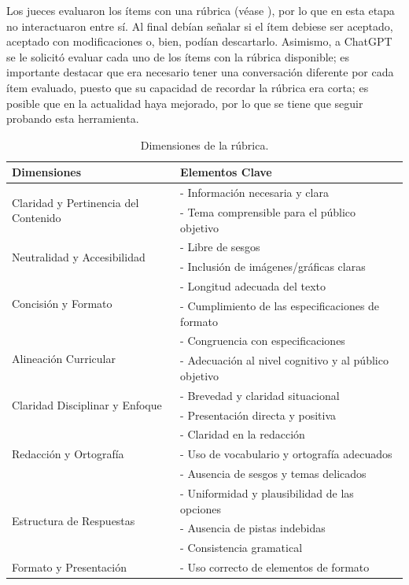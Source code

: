 Los jueces evaluaron los ítems con una rúbrica (véase ), por lo
que en esta etapa no interactuaron entre sí. Al final debían señalar si
el ítem debiese ser aceptado, aceptado con modificaciones o, bien,
podían descartarlo. Asimismo, a ChatGPT se le solicitó evaluar cada uno
de los ítems con la rúbrica disponible; es importante destacar que era
necesario tener una conversación diferente por cada ítem evaluado,
puesto que su capacidad de recordar la rúbrica era corta; es posible que
en la actualidad haya mejorado, por lo que se tiene que seguir probando
esta herramienta.



\begin{table}[!htpb]
\centering
\small
\caption{Dimensiones de la rúbrica.}
\label{tab-01}
\begin{tabular}{ll}
\toprule
Dimensiones & Elementos Clave \\
\midrule
\multirow{2}{*}{Claridad y Pertinencia del Contenido} & - Información necesaria y clara \\
    & - Tema comprensible para el público objetivo \\
\multirow{2}{*}{Neutralidad y Accesibilidad} & - Libre de sesgos\\
	& - Inclusión de imágenes/gráficas claras \\
\multirow{2}{*}{Concisión y Formato} & - Longitud adecuada del texto\\
		& - Cumplimiento de las especificaciones de formato \\
\multirow{2}{*}{Alineación Curricular} & - Congruencia con especificaciones\\
	& - Adecuación al nivel cognitivo y al público objetivo \\
\multirow{2}{*}{Claridad Disciplinar y Enfoque} & - Brevedad y claridad situacional\\
	& - Presentación directa y positiva \\
\multirow{3}{*}{Redacción y Ortografía} & - Claridad en la redacción\\
	& - Uso de vocabulario y ortografía adecuados\\
	& - Ausencia de sesgos y temas delicados \\
\multirow{3}{*}{Estructura de Respuestas} & - Uniformidad y plausibilidad de las opciones\\
	& - Ausencia de pistas indebidas\\
	& - Consistencia gramatical \\
Formato y Presentación & - Uso correcto de elementos de formato \\
\bottomrule
\end{tabular}
\end{table}


